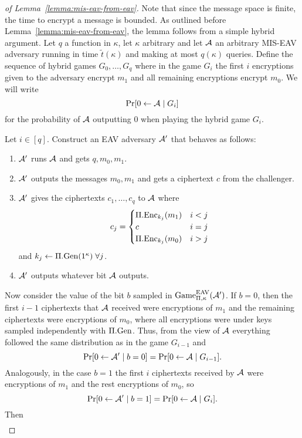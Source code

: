 \begin{proof}[of Lemma~\ref{lemma:mis-eav-from-eav}] Note that since the message space is finite, the time to encrypt a message is bounded. As outlined before Lemma~\ref{lemma:mis-eav-from-eav}, the lemma follows from a simple hybrid argument. Let $q$ a function in $\kappa$, let $\kappa$ arbitrary and let $\mathcal{A}$ an arbitrary MIS-EAV adversary running in time $\tilde{t}(\kappa)$ and making at most $q(\kappa)$ queries. Define the sequence of hybrid games $G_0, \ldots, G_q$ where in the game $G_i$ the first $i$ encryptions given to the adversary encrypt $m_1$ and all remaining encryptions encrypt $m_0$. We will write
	\[
		\pr{0 \from \adv \mid G_i}
	\]
	for the probability of $\mathcal{A}$ outputting $0$ when playing the hybrid game $G_i$.

	Let $i \in [q]$. Construct an EAV adversary $\mathcal{A}'$ that behaves as follows:
	\begin{enumerate}[1.]
		\item $\mathcal{A}'$ runs $\mathcal{A}$ and gets $q, m_0, m_1$.
		\item $\mathcal{A}'$ outputs the messages $m_0, m_1$ and gets a ciphertext $c$ from the challenger.
		\item $\mathcal{A}'$ gives the ciphertexts $c_1, \ldots, c_q$ to $\mathcal{A}$ where
		      \[
			      c_j = \begin{cases}
				      \Pi.\mathrm{Enc}_{k_j}(m_1) & i < j \\
				      c                   & i = j \\
				      \Pi.\mathrm{Enc}_{k_j}(m_0) & i > j
			      \end{cases}
		      \]
		      and $k_j \leftarrow \Pi.\mathrm{Gen}(1^\kappa) \; \forall j$.
		\item $\mathcal{A}'$ outputs whatever bit $\mathcal{A}$ outputs.
	\end{enumerate}
	Now consider the value of the bit $b$ sampled in $\mathrm{Game}_{\Pi, \kappa}^{\mathrm{EAV}}(\mathcal{A}')$. If $b = 0$, then the first $i - 1$ ciphertexts that $\mathcal{A}$ received were encryptions of $m_1$ and the remaining ciphertexts were encryptions of $m_0$, where all encryptions were under keys sampled independently with $\Pi.\mathrm{Gen}$. Thus, from the view of $\mathcal{A}$ everything followed the same distribution as in the game $G_{i - 1}$ and
	\[
		\pr{0 \from \adv' \mid b = 0} = \pr{0 \from \adv \mid G_{i - 1}}.
	\]
	Analogously, in the case $b = 1$ the first $i$ ciphertexts received by $\mathcal{A}$ were encryptions of $m_1$ and the rest encryptions of $m_0$, so
	\[
		\pr{0 \from \adv' \mid b = 1} = \pr{0 \from \adv \mid G_{i}}.
	\]
	Then
	\begin{align} \label{eq:eav-to-mis-eav-hybrid-distinguisher}

\end{align}
\end{proof}
